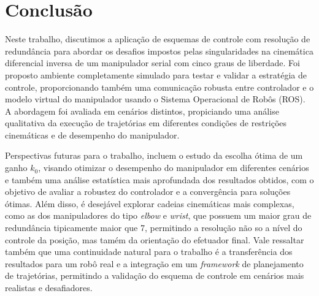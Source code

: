 \chapter{Conclusão}\label{cap:conclusao}

Neste trabalho, discutimos a aplicação de esquemas de controle com resolução de 
redundância para abordar os desafios impostos pelas singularidades na cinemática 
diferencial inversa de um manipulador serial com cinco graus de liberdade. Foi proposto ambiente completamente
simulado para testar e validar a estratégia de controle, proporcionando também uma comunicação robusta 
entre controlador e o modelo virtual do manipulador usando o Sistema Operacional de Robôs (ROS). 
A abordagem foi avaliada em cenários distintos, propiciando uma análise qualitativa da execução de
trajetórias em diferentes condições de restrições cinemáticas e de desempenho do manipulador.

Perspectivas futuras para o trabalho, incluem o estudo da escolha ótima de um ganho \(k_0\), visando otimizar 
o desempenho do manipulador em diferentes cenários e também uma análise estatística mais aprofundada dos resultados obtidos, com o objetivo de avaliar a robustez do
controlador e a convergência para soluções ótimas. Além disso, é desejável explorar cadeias cinemáticas 
mais complexas, como as dos manipuladores do tipo \emph{elbow} e \emph{wrist}, que possuem um maior 
grau de redundância tipicamente maior que 7, permitindo a resolução não so a nível do controle da posição, mas 
tamém da orientação do efetuador final. Vale ressaltar também que uma continuidade natural para o trabalho 
é a transferência dos resultados para um robô real e a integração em um \emph{framework} de planejamento de trajetórias, permitindo
a validação do esquema de controle em cenários mais realistas e desafiadores.